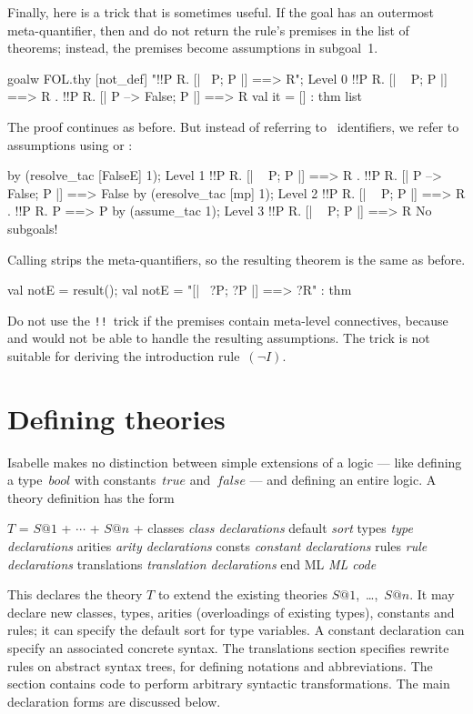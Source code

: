 \goodbreak\medskip
Finally, here is a trick that is sometimes useful.  If the goal
has an outermost meta-quantifier, then  and 
do not return the rule's premises in the list of theorems;  instead, the
premises become assumptions in subgoal~1.  
\begin{ttbox}
goalw FOL.thy [not_def] "!!P R. [| ~P;  P |] ==> R";
{\out Level 0}
{\out !!P R. [| ~ P; P |] ==> R}
{. !!P R. [| P --> False; P |] ==> R}
val it = [] : thm list
\end{ttbox}
The proof continues as before.  But instead of referring to \ML\
identifiers, we refer to assumptions using  or
\ttindex{assume_tac}: 
\begin{ttbox}
by (resolve_tac [FalseE] 1);
{\out Level 1}
{\out !!P R. [| ~ P; P |] ==> R}
{. !!P R. [| P --> False; P |] ==> False}
\ttbreak
by (eresolve_tac [mp] 1);
{\out Level 2}
{\out !!P R. [| ~ P; P |] ==> R}
{. !!P R. P ==> P}
\ttbreak
by (assume_tac 1);
{\out Level 3}
{\out !!P R. [| ~ P; P |] ==> R}
{\out No subgoals!}
\end{ttbox}
Calling  strips the meta-quantifiers, so the resulting
theorem is the same as before.
\begin{ttbox}
val notE = result();
{\out val notE = "[| ~?P; ?P |] ==> ?R" : thm}
\end{ttbox}
Do not use the {\tt!!}\ trick if the premises contain meta-level
connectives, because \ttindex{eresolve_tac} and  would
not be able to handle the resulting assumptions.  The trick is not suitable
for deriving the introduction rule~$(\neg I)$.


\section{Defining theories}\label{sec:defining-theories}
Isabelle makes no distinction between simple extensions of a logic --- like
defining a type~$bool$ with constants~$true$ and~$false$ --- and defining
an entire logic.  A theory definition has the form
\begin{ttbox}
\(T\) = \(S@1\) + \(\cdots\) + \(S@n\) +
classes      {\it class declarations}
default      {\it sort}
types        {\it type declarations}
arities      {\it arity declarations}
consts       {\it constant declarations}
rules        {\it rule declarations}
translations {\it translation declarations}
end
ML           {\it ML code}
\end{ttbox}
This declares the theory $T$ to extend the existing theories
$S@1$,~\ldots,~$S@n$.  It may declare new classes, types, arities
(overloadings of existing types), constants and rules; it can specify the
default sort for type variables.  A constant declaration can specify an
associated concrete syntax.  The translations section specifies rewrite
rules on abstract syntax trees, for defining notations and abbreviations.
The {\ML} section contains code to perform arbitrary syntactic
transformations.  The main declaration forms are discussed below.

